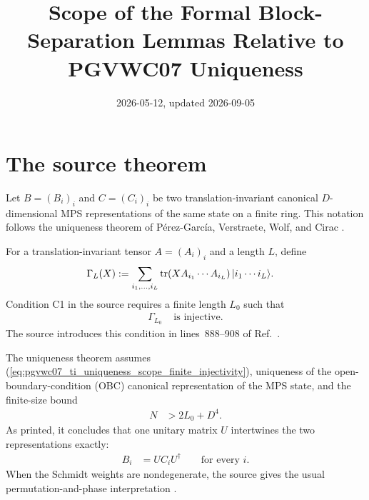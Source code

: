 \documentclass[11pt]{article}
\title{Scope of the Formal Block-Separation Lemmas Relative to PGVWC07 Uniqueness}
\author{}
\date{2026-05-12, updated 2026-09-05}
\begin{document}
\maketitle
{}

\section{The source theorem}

Let $B=(B_i)_i$ and $C=(C_i)_i$ be two translation-invariant canonical
$D$-dimensional MPS representations of the same state on a finite ring. This
notation follows the uniqueness theorem of P\'erez-Garc\'ia, Verstraete, Wolf,
and Cirac
\cite[Theorem~\texttt{thm-uniq}, lines~1002--1015]{PerezGarcia2007MPSReps}.

For a translation-invariant tensor $A=(A_i)_i$ and a length $L$, define
\begin{align}
    \Gamma_L(X)
     & :=
    \sum_{i_1,\ldots,i_L}
    \operatorname{tr}\!\left(XA_{i_1}\cdots A_{i_L}\right)
    |i_1\cdots i_L\rangle.
    \label{eq:pgvwc07_ti_uniqueness_scope_gamma_map}
\end{align}
Condition C1 in the source requires a finite length $L_0$ such that
\begin{align}
    \Gamma_{L_0}
     & \text{ is injective}.
    \label{eq:pgvwc07_ti_uniqueness_scope_finite_injectivity}
\end{align}
The source introduces this condition in lines~888--908 of
Ref.~\cite{PerezGarcia2007MPSReps}.

The uniqueness theorem assumes
(\ref{eq:pgvwc07_ti_uniqueness_scope_finite_injectivity}), uniqueness of the
open-boundary-condition (OBC) canonical representation of the MPS state, and
the finite-size bound
\begin{align}
    N
     & > 2L_0+D^4.
    \label{eq:pgvwc07_ti_uniqueness_scope_finite_size_bound}
\end{align}
As printed, it concludes that one unitary matrix $U$ intertwines the two
representations exactly:
\begin{align}
    B_i
     & =UC_iU^\dagger
    \qquad\text{for every }i.
    \label{eq:pgvwc07_ti_uniqueness_scope_printed_unitary_intertwiner}
\end{align}
When the Schmidt weights are nondegenerate, the source gives the usual
permutation-and-phase interpretation
\cite[Theorem~\texttt{thm-uniq}, lines~1002--1015]{PerezGarcia2007MPSReps}.
\end{document}
